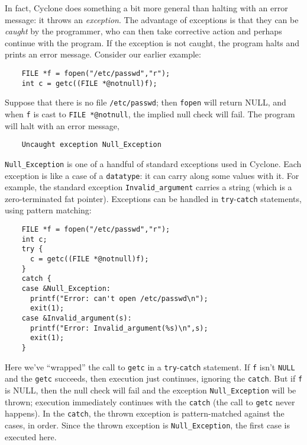 In fact, Cyclone does something a bit more general than halting with
an error message: it throws an \emph{exception}.  The advantage of
exceptions is that they can be \emph{caught} by the programmer, who
can then take corrective action and perhaps continue with the program.
If the exception is not caught, the program halts and prints an error
message.  Consider our earlier example:
\begin{verbatim}
    FILE *f = fopen("/etc/passwd","r");
    int c = getc((FILE *@notnull)f);
\end{verbatim}
Suppose that there is no file \texttt{/etc/passwd}; then
\texttt{fopen} will return NULL, and when \texttt{f} is cast to
\texttt{FILE *@notnull}, the implied null check will fail.  The program will
halt with an error message,
\begin{verbatim}
    Uncaught exception Null_Exception
\end{verbatim}
\texttt{Null_Exception} is one of a handful of standard exceptions
used in Cyclone.  Each exception is like a case of a \texttt{datatype}:
it can carry along some values with it.  For example, the standard
exception \texttt{Invalid_argument} carries a string (which is a
zero-terminated fat pointer).  Exceptions can be
handled in \texttt{try}-\texttt{catch} statements, using pattern
matching:
\begin{verbatim}
    FILE *f = fopen("/etc/passwd","r");
    int c;
    try {
      c = getc((FILE *@notnull)f);
    }
    catch {
    case &Null_Exception:
      printf("Error: can't open /etc/passwd\n");
      exit(1);
    case &Invalid_argument(s):
      printf("Error: Invalid_argument(%s)\n",s);
      exit(1);
    }
\end{verbatim}
Here we've ``wrapped'' the call to \texttt{getc} in a
\texttt{try}-\texttt{catch} statement.  If \texttt{f} isn't \texttt{NULL} and
the \texttt{getc} succeeds, then execution just continues, ignoring
the \texttt{catch}.  But if \texttt{f} is NULL, then the null check
will fail and the exception \texttt{Null_Exception} will be thrown;
execution immediately continues with the \texttt{catch} (the call to
\texttt{getc} never happens).  In the \texttt{catch}, the thrown
exception is pattern-matched against the cases, in order.  Since the thrown
exception is \texttt{Null_Exception}, the first case is executed here.


